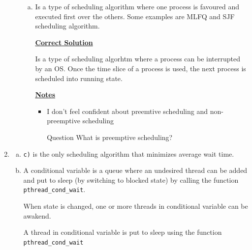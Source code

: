 \documentclass[12pt]{article}
\begin{document}
\begin{enumerate}[1.]
\begin{enumerate}[1)]
\begin{enumerate}[a)]
            \item

            Is a type of scheduling algorithm where one process is favoured and executed first
            over the others. Some examples are MLFQ and SJF scheduling algorithm.

            \bigskip

            \begin{mdframed}
            \underline{\textbf{Correct Solution}}

            \bigskip

            Is a type of scheduling algorhtm where a process can be interrupted by an OS. Once the
            time slice of a process is used, the next process is scheduled into running state.
            \end{mdframed}

            \bigskip

            \underline{\textbf{Notes}}

            \begin{itemize}
                \item I don't feel confident about preemtive scheduling and non-preemptive scheduling
                \item [\color{blue}Question\color{black}] What is preemptive scheduling?
            \end{itemize}
        \end{enumerate}
    \end{enumerate}

    \item

    \begin{enumerate}[a)]
        \item \texttt{c)} is the only scheduling algorithm that minimizes average wait time.
        \item

        \bigskip

        A conditional variable is a queue where an undesired thread can be added and put to sleep
        (by switching to blocked state) by calling the function \texttt{pthread\_cond\_wait}.

        \bigskip

        When state is changed, one or more threads in conditional variable can be awakend.

        \bigskip

        A thread in conditional variable is put to sleep using the function \texttt{pthread\_cond\_wait}


\end{enumerate}
\end{enumerate}
\end{document}
